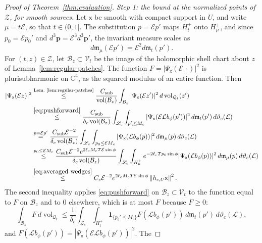\documentclass[11pt]{amsart}
\numberwithin{equation}{section}
\theoremstyle{definition}
\newcommand{\C}{\mathbb C}
\newcommand{\sx}{\mathsf x}
\newcommand{\bp}{\mathbf p}
\newcommand{\Energy}{\mathcal E}
\newcommand{\vol}{\operatorname{vol}}
\newcommand{\norm}[1]{\left\|#1\right\|}
\begin{document}
\begin{proof}[Proof of Theorem~\ref{thm:evaluation}]
\emph{Step 1: the bound at the normalized points of \(\mathscr Z\), for
smooth sources.} Let \(\sx\) be smooth with compact support in \(U\), and
write \(\mu=t\Energy\), so that \(t\in(0,1]\). The substitution
\(p=\Energy p'\) maps \(H_t^+\) onto \(H_\mu^+\), and since
\(p_0=\Energy p_0'\) and \(d^3\bp=\Energy^3d^3\bp'\), the invariant measure
scales as
\[
 d\mathfrak m_\mu(\Energy p')=\Energy^2d\mathfrak m_t(p').
\]
For \((t,z)\in\mathscr Z\), let \(\mathcal B_z\subset\mathcal V_t\) be the
image of the holomorphic shell chart about \(z\) of
Lemma~\ref{lem:regular-patches}. The function
\(F=|\Psi_\sx(\Energy\,\cdot)|^2\) is plurisubharmonic on \(\C^4\), as the
squared modulus of an entire function. Then
\begin{align*}
 |\Psi_\sx(\Energy z)|^2
 &\overset{\text{Lem.~\ref{lem:regular-patches}}}{\le}
   \frac{C_{\mathrm{sub}}}{\vol(\mathcal B_z)}
   \int_{\mathcal B_z}|\Psi_\sx(\Energy z')|^2\,d\vol_{\mathcal Q_t}(z')\\
 &\overset{\eqref{eq:pushforward}}{\le}
   \frac{C_{\mathrm{sub}}}{\delta_c\vol(\mathcal B_z)}
   \int_{\mathscr L_c}\int_{p_0'\le M_c}
   |\Psi_\sx(\Energy\mathcal Lb_\phi(p'))|^2
   \,d\mathfrak m_t(p')\,d\vartheta_c(\mathcal L)\\
 &\overset{p=\Energy p'}{=}
   \frac{C_{\mathrm{sub}}\Energy^{-2}}{\delta_c\vol(\mathcal B_z)}
   \int_{\mathscr L_c}\int_{p_0\le\Energy M_c}
   |\Psi_\sx(\mathcal Lb_\phi(p))|^2
   \,d\mathfrak m_\mu(p)\,d\vartheta_c(\mathcal L)\\
 &\overset{p_0\le\Energy M_c}{\le}
   \frac{C_{\mathrm{sub}}\Energy^{-2}e^{2\ell_cM_cT\Energy\sin\phi}}
   {\delta_c\vol(\mathcal B_z)}
   \int_{\mathscr L_c}\int_{H_\mu^+}
   e^{-2\ell_cTp_0\sin\phi}
   |\Psi_\sx(\mathcal Lb_\phi(p))|^2
   \,d\mathfrak m_\mu(p)\,d\vartheta_c(\mathcal L)\\
 &\overset{\eqref{eq:averaged-wedges}}{\le}
   C_c\Energy^{-2}e^{2\ell_cM_cT\Energy\sin\phi}\norm{h_{c,U}\sx}^2.
\end{align*}
The second inequality applies \eqref{eq:pushforward} on
\(\mathcal B_z\subset\mathcal V_t\) to the function equal to \(F\) on
\(\mathcal B_z\) and to \(0\) elsewhere, which is at most \(F\) because \(F\ge0\):
\[
 \int_{\mathcal B_z}F\,d\vol_{\mathcal Q_t}
 \le\frac1{\delta_c}\int_{\mathscr L_c}\int_{H_t^+}
 \mathbf1_{\{p_0'\le M_c\}}F(\mathcal Lb_\phi(p'))
 \,d\mathfrak m_t(p')\,d\vartheta_c(\mathcal L),
\]
and \(F(\mathcal Lb_\phi(p'))=|\Psi_\sx(\Energy\mathcal Lb_\phi(p'))|^2\). The

\end{proof}
\end{document}
